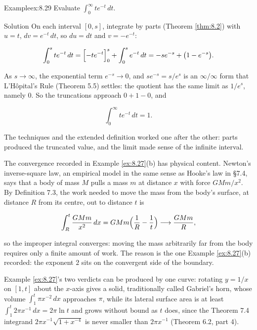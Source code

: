 \documentclass[a4paper,12pt,oneside]{memoir}
\begin{document}
\begin{workedexample}
\begin{envexample}{Example}{ex:8.29}{}
Evaluate \(\displaystyle\int_{0}^{\infty} t e^{-t}\,dt\).
\end{envexample}
\begin{envsolution}{Solution}{}{}
On each interval \([0, s]\), integrate by parts (Theorem \ref{thm:8.2}) with \(u = t\), \(dv = e^{-t}\,dt\), so \(du = dt\) and \(v = -e^{-t}\):

\[ \int_{0}^{s} t e^{-t}\,dt = \Bigl[-t e^{-t}\Bigr]_{0}^{s} + \int_{0}^{s} e^{-t}\,dt = -s e^{-s} + \bigl(1 - e^{-s}\bigr). \]

As \(s \to \infty\), the exponential term \(e^{-s} \to 0\), and \(s e^{-s} = s/e^{s}\) is an \(\infty/\infty\) form that L’Hôpital’s Rule (Theorem 5.5) settles: the quotient has the same limit as \(1/e^{s}\), namely \(0\). So the truncations approach \(0 + 1 - 0\), and

\[ \int_{0}^{\infty} t e^{-t}\,dt = 1. \]

The techniques and the extended definition worked one after the other: parts produced the truncated value, and the limit made sense of the infinite interval. \qedmark
\end{envsolution}
\end{workedexample}
The convergence recorded in Example \ref{ex:8.27}(b) has physical content. Newton’s inverse-square law, an empirical model in the same sense as Hooke’s law in §7.4, says that a body of mass \(M\) pulls a mass \(m\) at distance \(x\) with force \(GMm/x^{2}\). By Definition 7.3, the work needed to move the mass from the body’s surface, at distance \(R\) from its centre, out to distance \(t\) is

\[ \int_{R}^{t} \frac{GMm}{x^{2}}\,dx = GMm\Bigl(\frac{1}{R} - \frac{1}{t}\Bigr) \longrightarrow \frac{GMm}{R}, \]

so the improper integral converges: moving the mass arbitrarily far from the body requires only a finite amount of work. The reason is the one Example \ref{ex:8.27}(b) recorded: the exponent \(2\) sits on the convergent side of the boundary.

Example \ref{ex:8.27}’s two verdicts can be produced by one curve: rotating \(y = 1/x\) on \([1, t]\) about the \(x\)-axis gives a solid, traditionally called Gabriel’s horn, whose volume \(\int_{1}^{t}\pi x^{-2}\,dx\) approaches \(\pi\), while its lateral surface area is at least \(\int_{1}^{t} 2\pi x^{-1}\,dx = 2\pi\ln t\) and grows without bound as \(t\) does, since the Theorem 7.4 integrand \(2\pi x^{-1}\sqrt{1 + x^{-4}}\) is never smaller than \(2\pi x^{-1}\) (Theorem 6.2, part 4).
\end{document}
